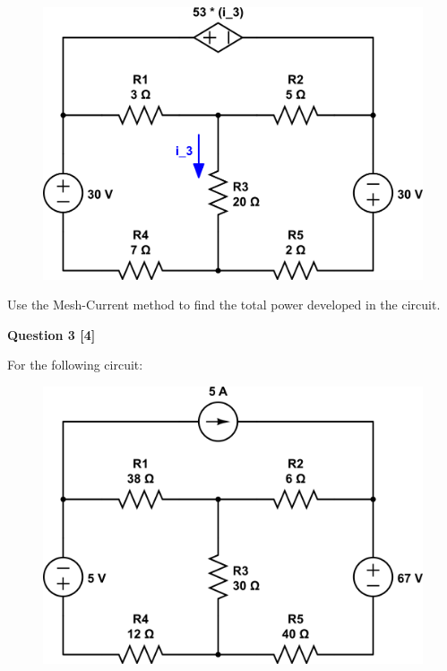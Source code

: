 \documentclass[12pt]{article}
\begin{document}
\begin{figure}[h!]
\begin{center}
 \includegraphics[scale=0.4]{fig4_40.png}
\end{center}
\end{figure}

Use the Mesh-Current method to find the total power developed in the circuit.

\newpage

{\bf Question 3 [4]} %

For the following circuit:

\begin{figure}[h!]
\begin{center}
 \includegraphics[scale=0.4]{fig4_45.png}
\end{center}
\end{figure}
\end{document}
